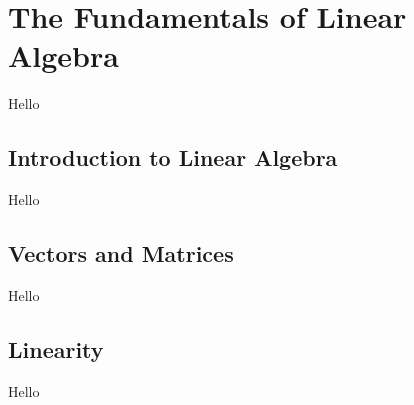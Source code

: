 \chapter{The Fundamentals of Linear Algebra}
Hello

\section{Introduction to Linear Algebra}
Hello

\section{Vectors and Matrices}
Hello

\section{Linearity}
Hello
